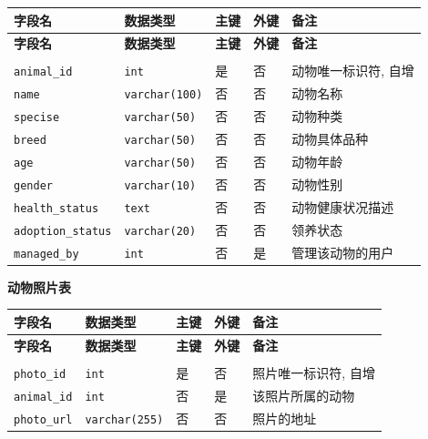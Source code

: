 \documentclass[12pt,a4paper,UTF8]{article}
\begin{document}
\begin{xltabular}{\linewidth}{|>{\raggedright\arraybackslash}p{3.5cm}|>{\raggedright\arraybackslash}p{3cm}|>{\raggedright\arraybackslash}p{1cm}|>{\raggedright\arraybackslash}p{1cm}|>{\raggedright\arraybackslash}p{5cm}|}
\hline
\textbf{字段名} & \textbf{数据类型} & \textbf{主键} & \textbf{外键} & \textbf{备注} \\ \hline
\endfirsthead

\hline
\textbf{字段名} & \textbf{数据类型} & \textbf{主键} & \textbf{外键} & \textbf{备注} \\ \hline
\endhead

\hline
{} \\
\endfoot

\hline 
\endlastfoot

\verb|animal_id| & \verb|int| & 是 & 否 & 动物唯一标识符, 自增 \\ \hline
\verb|name| & \verb|varchar(100)| & 否 & 否 & 动物名称 \\ \hline
\verb|specise| & \verb|varchar(50)| & 否 & 否 & 动物种类 \\ \hline
\verb|breed| & \verb|varchar(50)| & 否 & 否 & 动物具体品种 \\ \hline
\verb|age| & \verb|varchar(50)| & 否 & 否 & 动物年龄\\ \hline
\verb|gender| & \verb|varchar(10)| & 否 & 否 & 动物性别\\ \hline
\verb|health_status| & \verb|text| & 否 & 否 & 动物健康状况描述 \\ \hline
\verb|adoption_status| & \verb|varchar(20)| & 否 & 否 & 领养状态 \\ \hline
\verb|managed_by| & \verb|int| & 否 & 是 & 管理该动物的用户\\ \hline
\end{xltabular}

\vspace{0.25cm}

\noindent\textbf{动物照片表}

\begin{xltabular}{\linewidth}{|>{\raggedright\arraybackslash}p{3cm}|>{\raggedright\arraybackslash}p{3cm}|>{\raggedright\arraybackslash}p{1cm}|>{\raggedright\arraybackslash}p{1cm}|>{\raggedright\arraybackslash}p{5cm}|}
\hline
\textbf{字段名} & \textbf{数据类型} & \textbf{主键} & \textbf{外键} & \textbf{备注} \\ \hline
\endfirsthead

\hline
\textbf{字段名} & \textbf{数据类型} & \textbf{主键} & \textbf{外键} & \textbf{备注} \\ \hline
\endhead

\hline
{} \\
\endfoot

\hline 
\endlastfoot

\verb|photo_id| & \verb|int| & 是 & 否 & 照片唯一标识符, 自增 \\ \hline
\verb|animal_id| & \verb|int| & 否 & 是 & 该照片所属的动物  \\ \hline
\verb|photo_url| & \verb|varchar(255)| & 否 & 否 & 照片的地址 \\ \hline
\end{xltabular}
\end{document}

